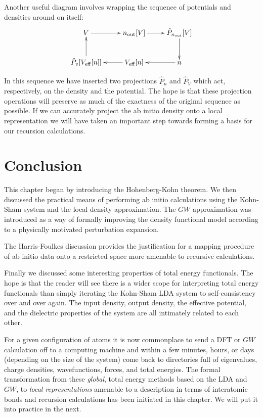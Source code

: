 Another useful diagram involves wrapping the sequence of potentials and densities around on itself:
%
\[\xymatrix{
	V \ar[r] & n_{\rm out}[V] \ar[r] & \hat{P}_{n_{\rm out}}[V] \ar[d] \\
	\hat{P}_{v}[V_{\rm eff}[n]] \ar[u] & V_{\rm eff}[n] \ar[l] & n\ar[l] \\
}
\]

In this sequence we have inserted two 
projections $\hat{P}_{n}$ and $\hat{P}_{V}$ which act, respectively, on the density and the potential. 
The hope is that these projection operations will preserve as much of the 
exactness of the original sequence as possible. If we can accurately project the ab initio density 
onto a local representation we will have taken an important step towards forming
a basis for our recursion calculations.

\section{Conclusion}
\noindent
This chapter began by introducing the Hohenberg-Kohn theorem. 
We then discussed the practical means of performing
ab initio calculations using the Kohn-Sham system and the local density
approximation. The $GW$ approximation was introduced as a way of formally
improving the density functional model according to a physically motivated
perturbation expansion.

The Harris-Foulkes discussion provides the justification for a mapping procedure
of ab initio data onto a restricted space more amenable to recursive
calculations.

Finally we discussed some interesting properties of total 
energy functionals. The hope is that the reader will see there is a wider
scope for interpreting total energy functionals than simply iterating the Kohn-Sham LDA
system to self-consistency over and over again. The input density, output density, 
the effective potential, and the dielectric properties of the system are all 
intimately related to each other.

For a given configuration of atoms it is now commonplace to send a 
DFT or $GW$ calculation off to a computing machine and within a few minutes, hours, or 
days (depending on the size of the system) come back to directories 
full of eigenvalues, charge densities, wavefunctions, forces, and total energies.
The formal transformation from these  \textit{global}, total energy methods 
based on the LDA and $GW$, to \textit{local representations} amenable 
to a description in terms of interatomic bonds and 
recursion calculations has been initiated in this chapter. We
will put it into practice in the next.
